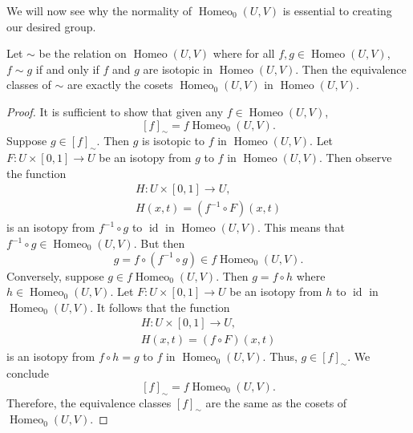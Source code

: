 \documentclass{amsart}
\DeclareMathOperator{\id}{id}
\DeclareMathOperator{\Homeo}{Homeo}
\begin{document}
We will now see why the normality of \(\Homeo_0(U, V)\) is essential to
creating our desired group.
\begin{proposition}
   Let \(\sim\) be the relation on \(\Homeo(U, V)\) where for all \(f,
	g\in\Homeo(U,V)\), \(f\sim g\) if and only if \(f\) and \(g\) are isotopic
	in \(\Homeo(U, V)\). Then the equivalence classes of \(\sim\) are exactly
	the cosets \(\Homeo_0(U, V)\) in \(\Homeo(U, V)\).
\end{proposition}
\begin{proof}
   It is sufficient to show that given any \(f\in\Homeo(U, V)\), 
	\[
		[f]_\sim = f\Homeo_0(U, V).
	\] 
	Suppose \(g\in [f]_\sim\). Then \(g\) is isotopic to \(f\) in
	\(\Homeo(U, V)\). Let \(F: U\times [0, 1]\to U\) be an isotopy from \(g\) to
	\(f\) in \(\Homeo(U, V)\). Then
	observe the function 
	\begin{align*}
		H: U\times [0, 1]\to U,\\
		H(x, t) = (f^{-1}\circ F)(x, t)
	\end{align*} 
	is an isotopy from \(f^{-1}\circ g\) to \(\id\) in \(\Homeo(U,
	V)\).
	This means that \(f^{-1}\circ g\in\Homeo_0(U, V)\). But then 
	\[
		g = f\circ (f^{-1}\circ g) \in f\Homeo_0(U, V).
	\] 
	Conversely, suppose \(g\in f\Homeo_0(U, V)\). Then \(g = f\circ h\)
	where \(h\in\Homeo_0(U, V)\). Let \(F: U\times [0, 1]\to U\) be an isotopy
	from \(h\) to \(\id\) in \(\Homeo_0(U, V)\). It follows that the function
	\begin{align*}
		H: U\times [0, 1]\to U,\\
		H(x, t) = (f\circ F)(x, t)
	\end{align*}
	is an isotopy from \(f\circ h = g\) to \(f\) in \(\Homeo_0(U,
	V)\). Thus, \(g\in[f]_\sim\). We conclude 
	\[
		[f]_\sim = f\Homeo_0(U, V).
	\] 
	Therefore, the equivalence classes \([f]_\sim\) are the same as the
	cosets of \(\Homeo_0(U, V)\).
\end{proof}
\end{document}

